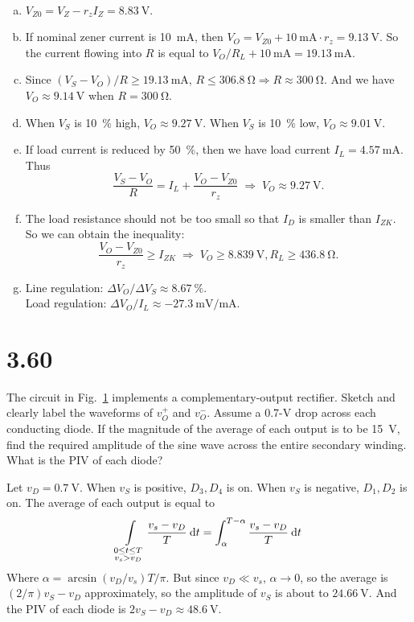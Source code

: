 \documentclass[12pt, a4paper]{article}
\begin{document}
\Ans \\
\begin{enumerate}[(a)]
  \item $V_{Z0} = V_Z - r_z I_Z = \SI{8.83}{\V}$.
  \item If nominal zener current is \SI{10}{\mA}, then $V_O = V_{Z0} + \SI{10}{\mA} \cdot r_z = \SI{9.13}{\V}$.
So the current flowing into $R$ is equal to $V_O/R_L + \SI{10}{\mA} =
\SI{19.13}{\mA}$.
  \item Since $(V_S - V_O)/R \ge \SI{19.13}{\mA}$,
$R \le \SI{306.8}{\ohm} \Rightarrow R \approx \SI{300}{\ohm}$. And we have
$V_O \approx \SI{9.14}{\V}$ when $R = \SI{300}{\ohm}$. 
  \item When $V_S$ is \SI{10}{\percent} high, $V_O \approx \SI{9.27}{\V}$. When $V_S$ is \SI{10}{\percent} low, $V_O \approx \SI{9.01}{\V}$.
  \item If load current is reduced by \SI{50}{\percent}, then we have load current
$I_L = \SI{4.57}{\mA}$. Thus
\[ \frac{V_S - V_O}{R} = I_L + \frac{V_O - V_{Z0}}{r_z}
  \; \Rightarrow \; V_O \approx \SI{9.27}{\V}. \]
  \item The load resistance should not be too small so that $I_D$ is smaller than
$I_{ZK}$. So we can obtain the inequality:
\[ \frac{V_O - V_{Z0}}{r_z} \ge I_{ZK} \; \Rightarrow \;
V_O \ge \SI{8.839}{\V}, R_L \ge \SI{436.8}{\ohm}. \]
\item Line regulation: $\Delta V_O/ \Delta V_S \approx \SI{8.67}{\percent}$. \\
Load regulation: $\Delta V_O/I_L \approx \SI{-27.3}{\mV/\mA}$.
\end{enumerate}

\section{3.60}
The circuit in Fig.~\ref{fig:3.60} implements a complementary-output
rectifier. Sketch and clearly label the waveforms of $v_O^+$ and $v_O^-$.
Assume a 0.7-\si{\V} drop across each conducting diode. If the
magnitude of the average of each output is to be \SI{15}{\V}, find
the required amplitude of the sine wave across the entire secondary
winding. What is the PIV of each diode?

\begin{figure}[H]
  
  \caption{}
  \label{fig:3.60}
\end{figure}

Let $v_D = \SI{0.7}\V$. When $v_S$ is positive, $D_3, D_4$ is on. When $v_S$ is negative, 
$D_1, D_2$ is on. The average of each output is equal to
\[
  \int\limits_{\substack{0 \leq t \leq T \\ v_s > v_D}} \frac{v_s - v_D}{T} \:\mathrm{d} t = \int_{\alpha}^{T-\alpha} \frac{v_s - v_D}{T} \:\mathrm{d} t
\]
Where $\alpha = \arcsin(v_D/v_s) T / \pi$. But since $v_D \ll v_s$, $\alpha \rightarrow 0$, so the average is $(2/\pi) v_S - v_D$ approximately, so the amplitude of $v_S$ is about to
$\SI{24.66}{\V}$.
And the PIV of each diode is $2v_S - v_D \approx \SI{48.6}{\V}$.

% 
\end{document}
